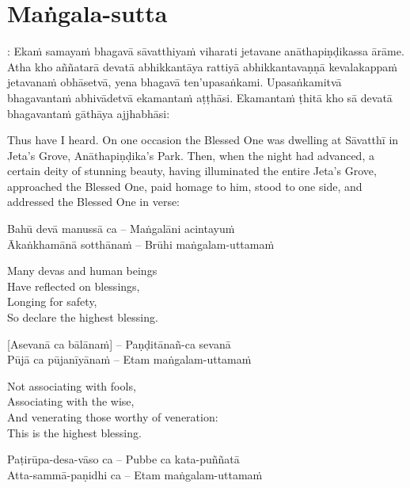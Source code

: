 \suttaRef{[Thai]}

\section{Maṅgala-sutta}
\label{mangala-sutta}

\vspace{-0.6em}

\begin{pali-hang}
: Ekaṁ samayaṁ bhagavā sāvatthiyaṁ viharati jetavane anāthapiṇḍikassa ārāme. Atha kho aññatarā devatā abhikkantāya rattiyā abhikkantavaṇṇā kevalakappaṁ jetavanaṁ obhāsetvā, yena bhagavā ten'upasaṅkami. Upasaṅkamitvā bhagavantaṁ abhivādetvā ekamantaṁ aṭṭhāsi. Ekamantaṁ ṭhitā kho sā devatā bhagavantaṁ gāthāya ajjhabhāsi:
\end{pali-hang}

\begin{english-hang-verses}
  Thus have I heard. On one occasion the Blessed One was dwelling at Sāvatthī in Jeta's Grove, Anāthapiṇḍika's Park. Then, when the night had advanced, a certain deity of stunning beauty, having illuminated the entire Jeta's Grove, approached the Blessed One, paid homage to him, stood to one side, and addressed the Blessed One in verse:
\end{english-hang-verses}

Bahū devā manussā ca – Maṅgalāni acintayuṁ\\
Ākaṅkhamānā sotthānaṁ – Brūhi maṅgalam-uttamaṁ

\begin{english-verses}
  Many devas and human beings\\
  Have reflected on blessings,\\
  Longing for safety,\\
  So declare the highest blessing.
\end{english-verses}

[Asevanā ca bālānaṁ] – Paṇḍitānañ-ca sevanā\\
Pūjā ca pūjanīyānaṁ – Etam maṅgalam-uttamaṁ

\begin{english-verses}
  Not associating with fools,\\
  Associating with the wise,\\
  And venerating those worthy of veneration:\\
  This is the highest blessing.
\end{english-verses}

Paṭirūpa-desa-vāso ca – Pubbe ca kata-puññatā\\
Atta-sammā-paṇidhi ca – Etam maṅgalam-uttamaṁ

